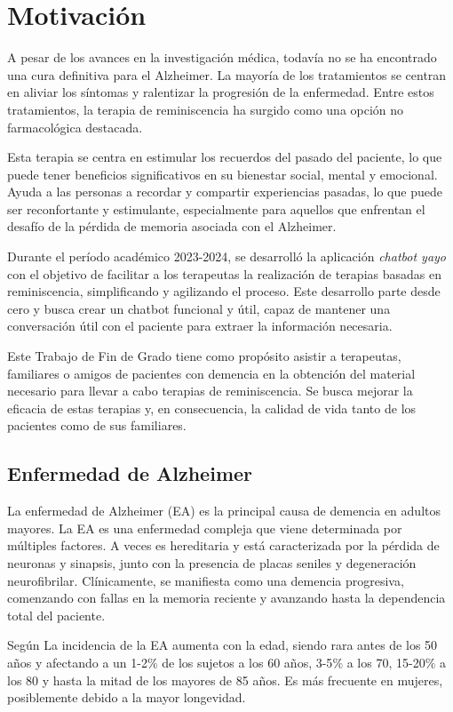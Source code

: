 \section{Motivación}

A pesar de los avances en la investigación médica, todavía no se ha encontrado una cura definitiva para el Alzheimer. La mayoría de los tratamientos se centran en aliviar los síntomas y ralentizar la progresión de la enfermedad. Entre estos tratamientos, la terapia de reminiscencia ha surgido como una opción no farmacológica destacada.

Esta terapia se centra en estimular los recuerdos del pasado del paciente, lo que puede tener beneficios significativos en su bienestar social, mental y emocional. Ayuda a las personas a recordar y compartir experiencias pasadas, lo que puede ser reconfortante y estimulante, especialmente para aquellos que enfrentan el desafío de la pérdida de memoria asociada con el Alzheimer.

Durante el período académico 2023-2024, se desarrolló la aplicación \textit{chatbot yayo} con el objetivo de facilitar a los terapeutas la realización de terapias basadas en reminiscencia, simplificando y agilizando el proceso. Este desarrollo parte desde cero y busca crear un chatbot funcional y útil, capaz de mantener una conversación útil con el paciente para extraer la información necesaria.

Este Trabajo de Fin de Grado tiene como propósito asistir a terapeutas, familiares o amigos de pacientes con demencia en la obtención del material necesario para llevar a cabo terapias de reminiscencia. Se busca mejorar la eficacia de estas terapias y, en consecuencia, la calidad de vida tanto de los pacientes como de sus familiares. 

\subsection{Enfermedad de Alzheimer}
La enfermedad de Alzheimer (EA) es la principal causa de demencia en adultos mayores. La EA es una enfermedad compleja que viene determinada por múltiples factores. A veces es hereditaria y está caracterizada por la pérdida de neuronas y sinapsis, junto con la presencia de placas seniles y degeneración neurofibrilar. Clínicamente, se manifiesta como una demencia progresiva, comenzando con fallas en la memoria reciente y avanzando hasta la dependencia total del paciente.

Según \cite{Donoso2003} La incidencia de la EA aumenta con la edad, siendo rara antes de los 50 años y afectando a un 1-2$\%$ de los sujetos a los 60 años, 3-5$\%$ a los 70, 15-20$\%$ a los 80 y hasta la mitad de los mayores de 85 años. Es más frecuente en mujeres, posiblemente debido a la mayor longevidad.

